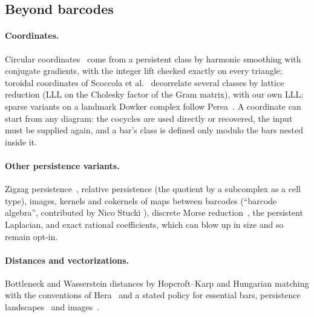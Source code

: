\subsection{Beyond barcodes}\label{sec:breadth}

\paragraph{Coordinates.}
Circular coordinates~\cite{desilva2011circular} come from a persistent class by harmonic smoothing with conjugate gradients, with the integer lift
checked exactly on every triangle; toroidal coordinates of Scoccola et al.~\cite{scoccola2022toroidal} decorrelate several
classes by lattice reduction (LLL on the Cholesky factor of the Gram matrix), with our own LLL; sparse variants on a landmark
Dowker complex follow Perea~\cite{perea2018multiscale}. A coordinate can start from any diagram: the cocycles are used directly or recovered, the
input must be supplied again, and a bar's class is defined only modulo the bars nested inside it.

\paragraph{Other persistence variants.}
Zigzag persistence~\cite{carlsson2010zigzag}, relative persistence (the quotient by a subcomplex as a cell type), images, kernels and cokernels
of maps between barcodes (``barcode algebra'', contributed by Nico Stucki ), discrete Morse reduction~\cite{mischaikow2013morse},
the persistent Laplacian, and exact rational coefficients, which can blow up in size and so remain opt-in.

\paragraph{Distances and vectorizations.}
Bottleneck and Wasserstein distances by Hopcroft--Karp and Hungarian matching with the conventions of Hera~\cite{kerber2017hera}
and a stated policy for essential bars, persistence landscapes~\cite{bubenik2015landscapes} and images~\cite{adams2017images}.

